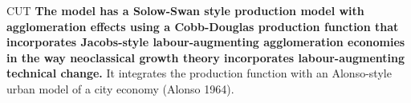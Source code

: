 








CUT \textbf{The model has a Solow-Swan style production model with agglomeration effects using a \gls{Cobb-Douglas} production function that incorporates Jacobs-style labour-augmenting agglomeration economies %
in the way neoclassical growth theory incorporates labour-augmenting technical change.}
It integrates the production function with an Alonso-style urban model of a city economy (Alonso 1964). 

